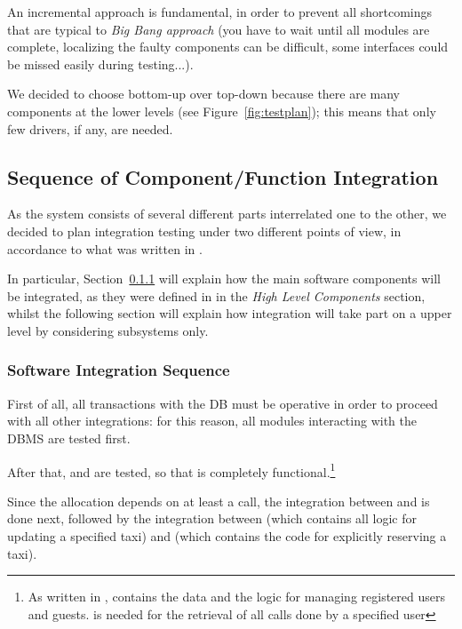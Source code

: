 \documentclass[a4paper, 12pt]{article}
\newcounter{tc}
\begin{document}
An incremental approach is fundamental, in order to prevent all shortcomings that are typical to \emph{Big Bang approach} (you have to wait until all modules are complete, localizing the faulty components can be difficult, some interfaces could be missed easily during testing...).

We decided to choose bottom-up over top-down because there are many components at the lower levels (see Figure~\ref{fig:testplan}); this means that only few drivers, if any, are needed.

\newpage
\subsection{Sequence of Component/Function Integration}
\label{sub:sequence_of_component_function_integration}
As the system consists of several different parts interrelated one to the other, we decided to plan integration testing under two different points of view, in accordance to what was written in \cite[p.~4]{bib:dd}.

In particular, Section~\ref{ssub:software_integration_sequence} will explain how the main software components will be integrated, as they were defined in \cite{bib:dd} in the \emph{High Level Components} section, whilst the following section will explain how integration will take part on a upper level by considering subsystems only.

\subsubsection{Software Integration Sequence}
\label{ssub:software_integration_sequence}

First of all, all transactions with the DB must be operative in order to proceed with all other integrations: for this reason, all modules interacting with the DBMS are tested first.

After that,  and  are tested, so that  is completely functional.\footnote{As written in \cite{bib:dd},  contains the data and the logic for managing registered users and guests.  is needed for the retrieval of all calls done by a specified user}

Since the allocation depends on at least a call, the integration between  and  is done next, followed by the integration between  (which contains all logic for updating a specified taxi) and  (which contains the code for explicitly reserving a taxi).
\end{document}
